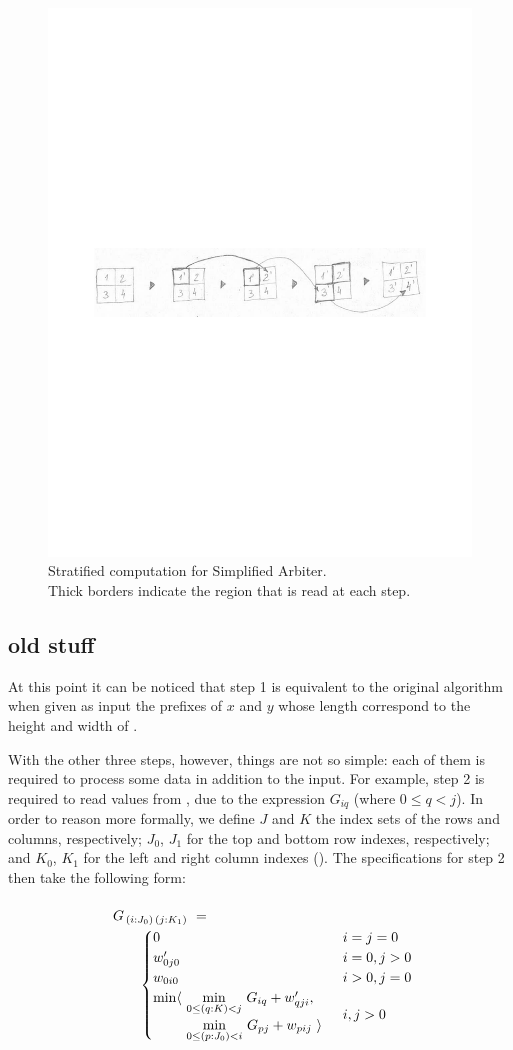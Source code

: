 \begin{figure}
\includegraphics[width=.47\textwidth]{img/gap-stratify1}
\caption[caption]{\label{intro:chain}
  Stratified computation for Simplified Arbiter. \\[.2em]
  Thick borders indicate the region that is read at each step.}
\end{figure}


\subsection{old stuff}


At this point it can be noticed that step 1 is equivalent to the original
algorithm when given as input the prefixes of $x$ and $y$ whose length correspond to the
height and width of .

With the other three steps, however, things are not so simple:
each of them is required to process some data in addition to the input.
For example, step 2 is required to read values from , due to the expression
$G_{iq}$ (where $\scriptstyle 0\leq q<j$).
In order to reason more formally, we define $J$ and $K$ the index sets of the rows
and columns, respectively; $J_0$, $J_1$ for the top and bottom row indexes, respectively;
and $K_0$, $K_1$ for the left and right column indexes ().
The specifications for step 2 then take the following form:

\begin{equation}\LeftEqNo
\renewcommand\arraystretch{1.5}
\begin{array}{l@{}l}
	G_{\,(i : J_0)\,(j : K_1)} ~=~  \\
	\qquad
	\begin{cases}
		0                        & i=j=0 \\
		w'_{0j0}                 & i=0, j>0 \\
		w_{0i0}                  & i>0, j=0 \\
		\begin{array}{@{}l@{~}l}
		  \min\langle & \underset{0\leq (q:K) <j}\min ~ G_{iq} + w'_{qji}, \\
		              & \underset{0\leq (p:J_0) <i}\min ~ G_{pj} + w_{pij}~\rangle
		\end{array}              & i,j>0
	\end{cases}
\end{array}
\end{equation}

